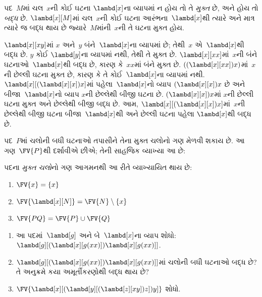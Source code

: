 \begin{defn}[મુક્ત અને બદ્ધ ઘટના]
  પદ~$M$માં ચલ~$x$ની કોઈ ઘટના $\lambd[x]$ના વ્યાપમાં ન હોય તો
  તે \emph{મુક્ત} છે, અને હોય તો \emph{બદ્ધ} છે.
  $\lambd[x][M]$માં ચલ~$x$ની કોઈ ઘટના આરંભના~$\lambd[x]$થી
  ત્યારે અને માત્ર ત્યારે જ બદ્ધ થાય છે જ્યારે~$M$માંની~$x$ની
  તે ઘટના મુક્ત હોય.
\end{defn}

\begin{ex}
  $\lambd[x][x y]$માં $x$ અને~$y$ બંને~$\lambd[x]$ના વ્યાપમાં
  છે; તેથી~$x$ એ~$\lambd[x]$થી બદ્ધ છે. $y$ કોઈ
  $\lambd[y]$ના વ્યાપમાં નથી, તેથી તે મુક્ત છે.
  $\lambd[x][x x]$માં~$x$ની બંને ઘટનાઓ~$\lambd[x]$થી બદ્ધ છે,
  કારણ કે~$xx$માં બંને મુક્ત છે.
  $((\lambd[x][xx])x)$માં~$x$ની છેલ્લી ઘટના મુક્ત છે, કારણ કે
  તે કોઈ~$\lambd[x]$ના વ્યાપમાં નથી.
  $\lambd[x][(\lambd[x][x])x]$માં પહેલા~$\lambd[x]$નો વ્યાપ
  $(\lambd[x][x])x$ છે અને બીજા~$\lambd[x]$નો વ્યાપ
  $x$ની છેલ્લેથી બીજી ઘટના છે. $(\lambd[x][x])x$માં
  $x$ની છેલ્લી ઘટના મુક્ત અને છેલ્લેથી બીજી બદ્ધ છે.
  આમ, $\lambd[x][(\lambd[x][x])x]$માં~$x$ની છેલ્લેથી બીજી
  ઘટના બીજા~$\lambd[x]$થી અને છેલ્લી ઘટના પહેલા
  $\lambd[x]$થી બદ્ધ છે.
\end{ex}

પદ~$P$માં ચલોની બધી ઘટનાઓ તપાસીને તેના મુક્ત ચલોનો ગણ
મેળવી શકાય છે. આ ગણ~$\FV{P}$થી દર્શાવીએ છીએ; તેની સાહજિક
વ્યાખ્યા આ છે:

\begin{defn}[પદના મુક્ત ચલો] 
  પદના \emph{મુક્ત ચલો}નો ગણ આગમનથી આ રીતે વ્યાખ્યાયિત થાય છે:
  \begin{enumerate}
    \item $\FV{x} = \{x\}$ 
    \item $\FV{\lambd[x][N]} = \FV{N} \setminus \{x\}$    
    \item $\FV{PQ} = \FV{P} \cup \FV{Q}$ 
  \end{enumerate}
\end{defn}

\begin{prob}
  \begin{enumerate}
  \item આ પદમાં~$\lambd[g]$ અને બે~$\lambd[x]$ના વ્યાપ શોધો:
    $\lambd[g][(\lambd[x][g (x x)]) \lambd[x][g (x x)]]$.
  \item $\lambd[g][(\lambd[x][g (x x)]) \lambd[x][g (x x)]]$માં
    ચલોની બધી ઘટનાઓ બદ્ધ છે? તે અનુક્રમે કયા અમૂર્તીકરણોથી
    બદ્ધ થાય છે?
    \item $\FV{\lambd[x][(\lambd[y][(\lambd[z][x y]) z]) y]}$
    શોધો.
  \end{enumerate}
\end{prob}

